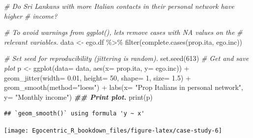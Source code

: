 \documentclass[
]{book}
\newenvironment{Shaded}{\begin{snugshade}}{\end{snugshade}}
\newcommand{\AttributeTok}[1]{\textcolor[rgb]{0.77,0.63,0.00}{#1}}
\newcommand{\CommentTok}[1]{\textcolor[rgb]{0.56,0.35,0.01}{\textit{#1}}}
\newcommand{\DecValTok}[1]{\textcolor[rgb]{0.00,0.00,0.81}{#1}}
\newcommand{\DocumentationTok}[1]{\textcolor[rgb]{0.56,0.35,0.01}{\textbf{\textit{#1}}}}
\newcommand{\FloatTok}[1]{\textcolor[rgb]{0.00,0.00,0.81}{#1}}
\newcommand{\FunctionTok}[1]{\textcolor[rgb]{0.00,0.00,0.00}{#1}}
\newcommand{\NormalTok}[1]{#1}
\newcommand{\OtherTok}[1]{\textcolor[rgb]{0.56,0.35,0.01}{#1}}
\newcommand{\SpecialCharTok}[1]{\textcolor[rgb]{0.00,0.00,0.00}{#1}}
\newcommand{\StringTok}[1]{\textcolor[rgb]{0.31,0.60,0.02}{#1}}
\begin{document}
\begin{Shaded}
\begin{Highlighting}[]
\CommentTok{\# Do Sri Lankans with more Italian contacts in their personal network have higher}
\CommentTok{\# income?}

\CommentTok{\# To avoid warnings from ggplot(), let\textquotesingle{}s remove cases with NA values on the}
\CommentTok{\# relevant variables.}
\NormalTok{data }\OtherTok{\textless{}{-}}\NormalTok{ ego.df }\SpecialCharTok{\%\textgreater{}\%}
  \FunctionTok{filter}\NormalTok{(}\FunctionTok{complete.cases}\NormalTok{(prop.ita, ego.inc))}

\CommentTok{\# Set seed for reproducibility (jittering is random).}
\FunctionTok{set.seed}\NormalTok{(}\DecValTok{613}\NormalTok{)}
\CommentTok{\# Get and save plot}
\NormalTok{p }\OtherTok{\textless{}{-}} \FunctionTok{ggplot}\NormalTok{(}\AttributeTok{data=}\NormalTok{ data, }\FunctionTok{aes}\NormalTok{(}\AttributeTok{x=}\NormalTok{ prop.ita, }\AttributeTok{y=}\NormalTok{ ego.inc)) }\SpecialCharTok{+} 
  \FunctionTok{geom\_jitter}\NormalTok{(}\AttributeTok{width=} \FloatTok{0.01}\NormalTok{, }\AttributeTok{height=} \DecValTok{50}\NormalTok{, }\AttributeTok{shape=} \DecValTok{1}\NormalTok{, }\AttributeTok{size=} \FloatTok{1.5}\NormalTok{) }\SpecialCharTok{+} 
  \FunctionTok{geom\_smooth}\NormalTok{(}\AttributeTok{method=}\StringTok{"loess"}\NormalTok{) }\SpecialCharTok{+} 
  \FunctionTok{labs}\NormalTok{(}\AttributeTok{x=} \StringTok{"Prop Italians in personal network"}\NormalTok{, }\AttributeTok{y=} \StringTok{"Monthly income"}\NormalTok{)}
\DocumentationTok{\#\# Print plot.}
\FunctionTok{print}\NormalTok{(p)}
\end{Highlighting}
\end{Shaded}

\begin{verbatim}
## `geom_smooth()` using formula 'y ~ x'
\end{verbatim}

\texttt{[image: Egocentric\_R\_bookdown\_files/figure-latex/case-study-6]}

  
\end{document}
